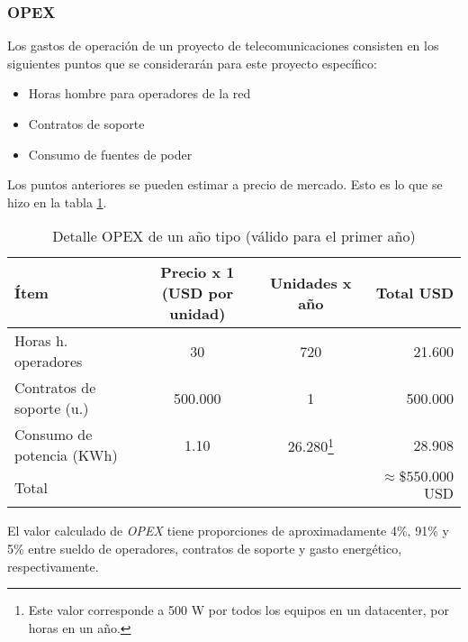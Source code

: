 \subsubsection{OPEX}
\label{sec:opex}

Los gastos de operación de un proyecto de telecomunicaciones consisten en los siguientes puntos que se considerarán para este proyecto específico:
\begin{itemize}
\item Horas hombre para operadores de la red
\item Contratos de soporte
\item Consumo de fuentes de poder
\end{itemize}

Los puntos anteriores se pueden estimar a precio de mercado. Esto es
lo que se hizo en la tabla \ref{tab:opex}.

\begin{table}[H]
  \centering
  \begin{tabular}{| l | c | c | r |}
    \hline
    \textbf{Ítem} & \textbf{Precio x 1 (USD por unidad)} & \textbf{Unidades x año} & \textbf{Total USD} \\
    \hline
    Horas h. operadores & 30 & 720 & 21.600 \\
    \hline
    Contratos de soporte (u.) & 500.000 & 1 & 500.000 \\
    \hline
    Consumo de potencia (KWh) & 1.10 & 26.280\footnote{Este valor corresponde a 500 W por todos los equipos en un datacenter, por horas en un año.} & 28.908 \\
    \hline
    Total & & & $\approx \$550.000$ USD \\
    \hline
  \end{tabular}
  \caption{Detalle OPEX de un año tipo (válido para el primer año)}
  \label{tab:opex}
\end{table}

El valor calculado de \emph{OPEX} tiene proporciones de
aproximadamente 4\%, 91\% y 5\% entre sueldo de operadores, contratos
de soporte y gasto energético, respectivamente.
